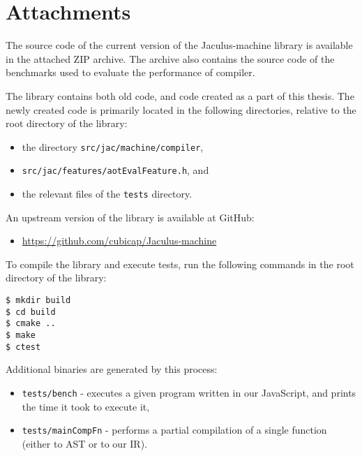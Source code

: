 \chapter{Attachments}\label{app:attachments}

The source code of the current version of the Jaculus-machine library is available in the attached ZIP archive. The archive also contains the source code of the benchmarks used to evaluate the performance of compiler.

The library contains both old code, and code created as a part of this thesis. The newly created code is primarily located in the following directories, relative to the root directory of the library:
\begin{itemize}
    \item the directory \texttt{src/jac/machine/compiler},
    \item \texttt{src/jac/features/aotEvalFeature.h}, and
    \item the relevant files of the \texttt{tests} directory.
\end{itemize}

\noindent
An upstream version of the library is available at GitHub:
\begin{itemize}
    \item \url{https://github.com/cubicap/Jaculus-machine}
\end{itemize}

\noindent
To compile the library and execute tests, run the following commands in the root directory of the library:
\begin{verbatim}
$ mkdir build
$ cd build
$ cmake ..
$ make
$ ctest
\end{verbatim}

\noindent
Additional binaries are generated by this process:
\begin{itemize}
    \item \texttt{tests/bench} - executes a given program written in our JavaScript, and prints the time it took to execute it,
    \item \texttt{tests/mainCompFn} - performs a partial compilation of a single function (either to AST or to our IR).
\end{itemize}

